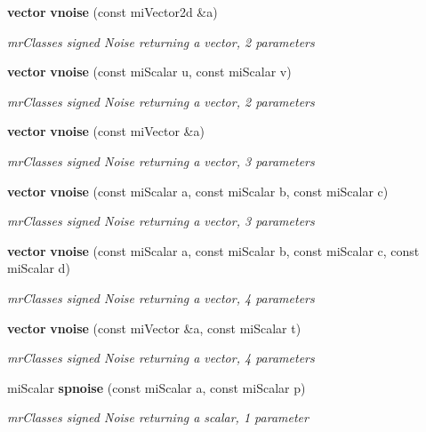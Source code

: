 \begin{CompactItemize}
{\bf vector} {\bf vnoise} (const mi\-Vector2d \&a)
\begin{CompactList}\small\item\em mr\-Classes signed Noise returning a vector, 2 parameters \item\end{CompactList}\item 
{\bf vector} {\bf vnoise} (const mi\-Scalar u, const mi\-Scalar v)
\begin{CompactList}\small\item\em mr\-Classes signed Noise returning a vector, 2 parameters \item\end{CompactList}\item 
{\bf vector} {\bf vnoise} (const mi\-Vector \&a)
\begin{CompactList}\small\item\em mr\-Classes signed Noise returning a vector, 3 parameters \item\end{CompactList}\item 
{\bf vector} {\bf vnoise} (const mi\-Scalar a, const mi\-Scalar b, const mi\-Scalar c)
\begin{CompactList}\small\item\em mr\-Classes signed Noise returning a vector, 3 parameters \item\end{CompactList}\item 
{\bf vector} {\bf vnoise} (const mi\-Scalar a, const mi\-Scalar b, const mi\-Scalar c, const mi\-Scalar d)
\begin{CompactList}\small\item\em mr\-Classes signed Noise returning a vector, 4 parameters \item\end{CompactList}\item 
{\bf vector} {\bf vnoise} (const mi\-Vector \&a, const mi\-Scalar t)
\begin{CompactList}\small\item\em mr\-Classes signed Noise returning a vector, 4 parameters \item\end{CompactList}\item 
mi\-Scalar {\bf spnoise} (const mi\-Scalar a, const mi\-Scalar p)
\begin{CompactList}\small\item\em mr\-Classes signed Noise returning a scalar, 1 parameter \item\end{CompactList}\item 

\end{CompactItemize}
